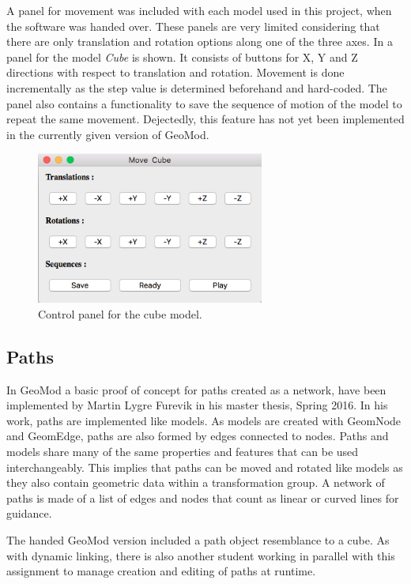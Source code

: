 A panel for movement was included with each model used in this project, when the software was handed over. These panels are very limited considering that there are only translation and rotation options along one of the three axes. In  a panel for the model \textit{Cube} is shown. It consists of buttons for X, Y and Z directions with respect to translation and rotation. Movement is done incrementally as the step value is determined beforehand and hard-coded. The panel also contains a functionality to save the sequence of motion of the model to repeat the same movement. Dejectedly, this feature has not yet been implemented in the currently given version of GeoMod. 

\begin{figure}[ht]
    \centering
    \includegraphics[height=5cm]{images/control_cube.png}
    \caption[Control panel for the cube model]{Control panel for the cube model.}
    \label{fig:controlcube}
\end{figure}


\subsection{Paths}

In GeoMod a basic proof of concept for paths created as a network, have been implemented by Martin Lygre Furevik in his master thesis, Spring 2016. In his work, paths are implemented like models. As models are created with GeomNode and GeomEdge, paths are also formed by edges connected to nodes. Paths and models share many of the same properties and features that can be used interchangeably. This implies that paths can be moved and rotated like models as they also contain geometric data within a transformation group. A network of paths is made of a list of edges and nodes that count as linear or curved lines for guidance. 

The handed GeoMod version included a path object resemblance to a cube. As with dynamic linking, there is also another student working in parallel with this assignment to manage creation and editing of paths at runtime.